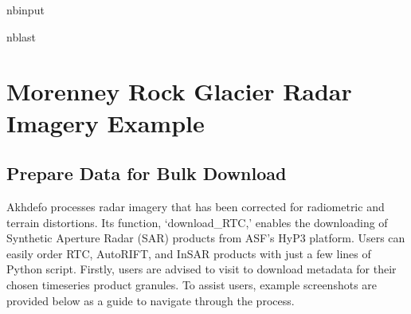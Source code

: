 \documentclass[letterpaper,10pt,english]{sphinxmanual}
\begin{document}
\begin{sphinxuseclass}{nbinput}
\begin{sphinxuseclass}{nblast}
{
\begin{sphinxVerbatim}[commandchars=\\\{\}]
\llap{\color{nbsphinxin}[ ]:\,\hspace{\fboxrule}\hspace{\fboxsep}}
                                    
\end{sphinxVerbatim}
}

\end{sphinxuseclass}
\end{sphinxuseclass}
\sphinxstepscope


\section{Morenney Rock Glacier Radar Imagery Example}
\label{\detokenize{notebooks/RockGlacier_radar:Morenney-Rock-Glacier-Radar-Imagery-Example}}\label{\detokenize{notebooks/RockGlacier_radar::doc}}

\subsection{Prepare Data for Bulk Download}
\label{\detokenize{notebooks/RockGlacier_radar:Prepare-Data-for-Bulk-Download}}
\sphinxAtStartPar
Akhdefo processes radar imagery that has been corrected for radiometric and terrain distortions. Its function, ‘download\_RTC,’ enables the downloading of Synthetic Aperture Radar (SAR) products from ASF’s HyP3 platform. Users can easily order RTC, AutoRIFT, and InSAR products with just a few lines of Python script. Firstly, users are advised to visit  to download metadata for their chosen time\sphinxhyphen{}series product granules. To assist
users, example screenshots are provided below as a guide to navigate through the process.
\end{document}
